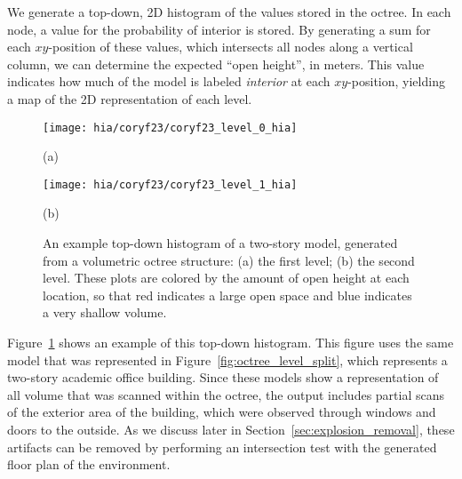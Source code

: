 \documentclass[12pt,onecolumn,oneside]{book}
\begin{document}
We generate a top-down, 2D histogram of the values stored in the octree.  In each node, a value for the probability of interior is stored.  By generating a sum for each $xy$-position of these values, which intersects all nodes along a vertical column, we can determine the expected ``open height'', in meters.  This value indicates how much of the model is labeled {\it interior} at each $xy$-position, yielding a map of the 2D representation of each level.

\begin{figure}[p]

	\centering
	\begin{minipage}[t]{0.75\linewidth}
		\centerline{\texttt{[image: hia/coryf23/coryf23\_level\_0\_hia]}}
		\centerline{(a)}
	\end{minipage}
	\hfill
	\begin{minipage}[t]{0.75\linewidth}
		\centerline{\texttt{[image: hia/coryf23/coryf23\_level\_1\_hia]}}
		\centerline{(b)}
	\end{minipage}

	\caption[Top-down histogram of two-story octree model.]{An example top-down histogram of a two-story model, generated from a volumetric octree structure: (a) the first level; (b) the second level.  These plots are colored by the amount of open height at each location, so that red indicates a large open space and blue indicates a very shallow volume.}
	\label{fig:hia_coryf23}
\end{figure}

Figure~\ref{fig:hia_coryf23} shows an example of this top-down histogram.  This figure uses the same model that was represented in Figure~\ref{fig:octree_level_split}, which represents a two-story academic office building.  Since these models show a representation of all volume that was scanned within the octree, the output includes partial scans of the exterior area of the building, which were observed through windows and doors to the outside.  As we discuss later in Section~\ref{sec:explosion_removal}, these artifacts can be removed by performing an intersection test with the generated floor plan of the environment.
\end{document}
